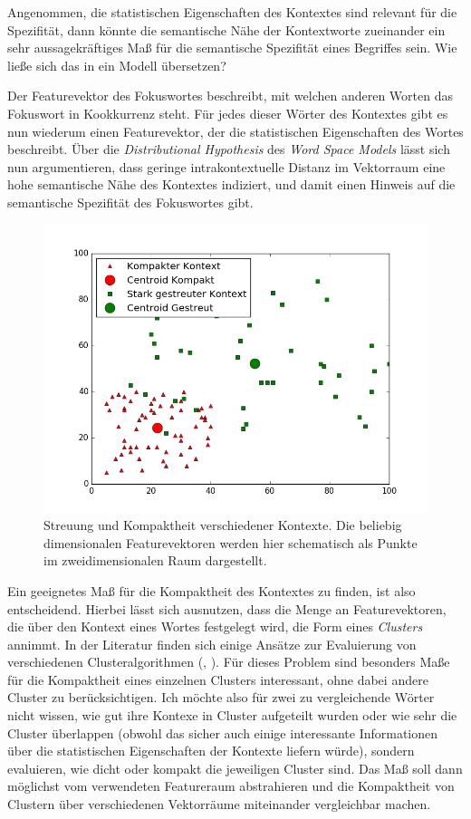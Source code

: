 \documentclass[11pt,numbers=noenddot]{scrartcl}
\begin{document}
Angenommen, die statistischen Eigenschaften des Kontextes sind relevant für die Spezifität, dann könnte die semantische Nähe der Kontextworte zueinander ein sehr aussagekräftiges Maß für die semantische Spezifität eines Begriffes sein. Wie ließe sich das in ein Modell übersetzen?

Der Featurevektor des Fokuswortes beschreibt, mit welchen anderen Worten das Fokuswort in Kookkurrenz steht. Für jedes dieser Wörter des Kontextes gibt es nun wiederum einen Featurevektor, der die statistischen Eigenschaften des Wortes beschreibt. Über die \emph{Distributional Hypothesis} des \emph{Word Space Models} lässt sich nun argumentieren, dass geringe intrakontextuelle Distanz im Vektorraum eine hohe semantische Nähe des Kontextes indiziert, und damit einen Hinweis auf die semantische Spezifität des Fokuswortes gibt.

\begin{figure}
    \includegraphics[width = \textwidth]{kontext}
    \caption{Streuung und Kompaktheit verschiedener Kontexte. Die beliebig dimensionalen Featurevektoren werden hier schematisch als Punkte im zweidimensionalen Raum dargestellt.}
    \label{kontext}
\end{figure}

Ein geeignetes Maß für die Kompaktheit des Kontextes zu finden, ist also entscheidend. Hierbei lässt sich ausnutzen, dass die Menge an Featurevektoren, die über den Kontext eines Wortes festgelegt wird, die Form eines \emph{Clusters} annimmt. In der Literatur finden sich einige Ansätze zur Evaluierung von verschiedenen Clusteralgorithmen (\citet{dunn1974}, \citet{Halkidi2001}). Für dieses Problem sind besonders Maße für die Kompaktheit eines einzelnen Clusters interessant, ohne dabei andere Cluster zu berücksichtigen. Ich möchte also für zwei zu vergleichende Wörter nicht wissen, wie gut ihre Kontexe in Cluster aufgeteilt wurden oder wie sehr die Cluster überlappen (obwohl das sicher auch einige interessante Informationen über die statistischen Eigenschaften der Kontexte liefern würde), sondern evaluieren, wie dicht oder kompakt die jeweiligen Cluster sind. Das Maß soll dann möglichst vom verwendeten Featureraum abstrahieren und die Kompaktheit von Clustern über verschiedenen Vektorräume miteinander vergleichbar machen.
\end{document}
